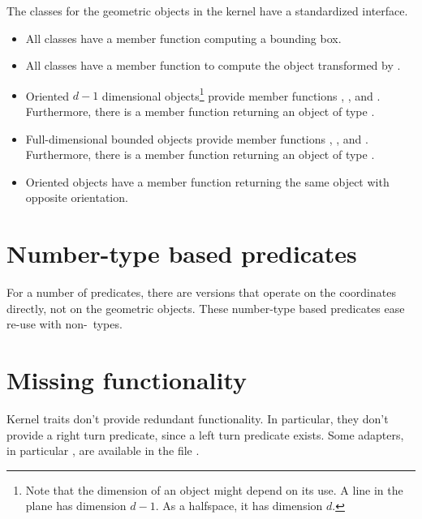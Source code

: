 The classes for the geometric objects in the kernel have a 
standardized interface.%
\begin{itemize}
\item
All classes have a  member function computing a bounding box.%
\item
All classes have a  member function
to compute the object transformed by .%
\item
Oriented $d-1$ dimensional objects\footnote{Note that the dimension
of an object might depend on its use. A line in the plane has dimension
$d-1$. As a halfspace, it has dimension $d$.} provide member functions
%
, %
, 
and %
. Furthermore, there is a member
function %
 returning an object of type
.
\item
Full-dimensional bounded objects provide member functions
%
, %
, 
and %
. Furthermore, there is a member
function %
 returning an object of type
.
\item
Oriented objects have a member function %
 returning
the same object with opposite orientation.
\end{itemize}


\section{Number-type based predicates}
For a number of predicates, there are versions that operate on
the coordinates directly, not on the geometric objects. These
number-type based predicates ease re-use with non-\cgal\ types.

\section{Missing functionality}
\label{sec:NewKernelTraits}
Kernel traits don't provide redundant functionality. In particular,
they don't provide a right turn predicate, since a left turn predicate
exists. Some adapters, in particular ,%
are available in the file 
. 

